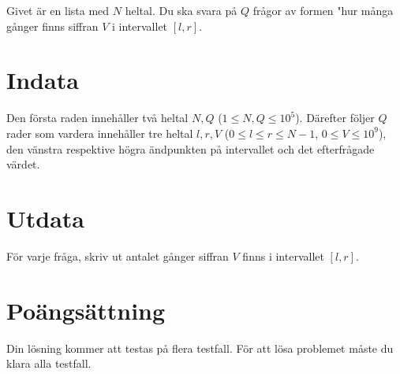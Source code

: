 Givet är en lista med $N$ heltal. Du ska svara på $Q$ frågor av formen "hur många gånger finns
siffran $V$ i intervallet $[l,r]$.

\section*{Indata}
Den första raden innehåller två heltal $N,Q$ ($1 \leq N,Q \leq 10^5$).
Därefter följer $Q$ rader som vardera innehåller tre heltal $l, r, V$ ($0 \leq l \leq r \leq N-1$, $0 \leq V \leq 10^9$),
den vänstra respektive högra ändpunkten på intervallet och det efterfrågade värdet.

\section*{Utdata}
För varje fråga, skriv ut antalet gånger siffran $V$ finns i intervallet $[l,r]$.

\section*{Poängsättning}
Din lösning kommer att testas på flera testfall.
\noindent
För att lösa problemet måste du klara alla testfall.

